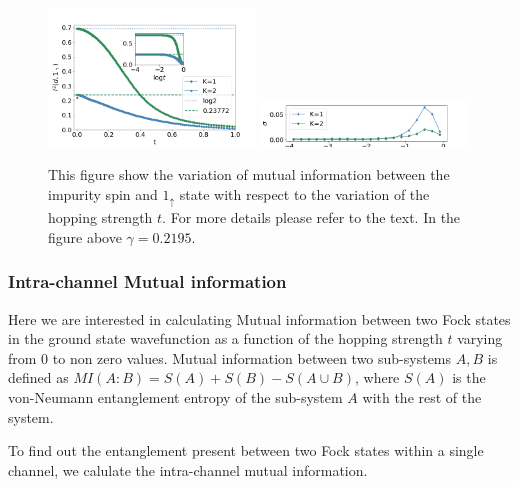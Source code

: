 \documentclass[reprint,prb,superscriptaddress]{revtex4-2}
\begin{document}
\begin{figure}[!htpb]
\includegraphics[width=0.49\textwidth]{plt/A_I2_ch12_['d','1_up']}
\includegraphics[width=0.49\textwidth]{plt/errorbar_A_I2_ch12_['d','1_up']}
\caption{This figure show the variation of mutual information between the impurity spin and $1_{\uparrow}$ state with respect to the variation of the hopping strength $t$. For more details please refer to the text. In the figure above $\gamma=0.2195$.}
\label{fig:MI_imp_1_vs_t_K}
\end{figure}

\subsubsection{Intra-channel Mutual information}

\noindent Here we are interested in calculating Mutual information between two Fock states in the ground state wavefunction as a function of the hopping strength $t$ varying from $0$ to non zero values. Mutual information between two sub-systems $A,B$ is defined as $MI(A:B)=S(A)+S(B)-S(A\cup B)$, where $S(A)$ is the von-Neumann entanglement entropy of the sub-system $A$ with the rest of the system. 

\noindent To find out the entanglement present between two Fock states within a single channel, we calulate the intra-channel mutual information.
\end{document}
